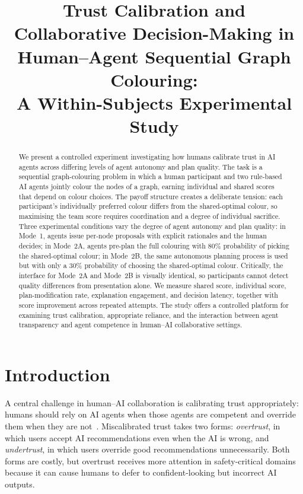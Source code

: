 \documentclass[11pt]{article}
\title{Trust Calibration and Collaborative Decision-Making in\\
       Human--Agent Sequential Graph Colouring:\\
       A Within-Subjects Experimental Study}
\author{}
\date{}
\theoremstyle{definition}
\begin{document}
\maketitle

\begin{abstract}

We present a controlled experiment investigating how humans calibrate trust in AI agents
across differing levels of agent autonomy and plan quality.  The task is a sequential
graph-colouring problem in which a human participant and two rule-based AI agents jointly
colour the nodes of a graph, earning individual and shared scores that depend on colour
choices.  The payoff structure creates a deliberate tension: each participant's individually
preferred colour differs from the shared-optimal colour, so maximising the team score
requires coordination and a degree of individual sacrifice.  Three experimental conditions
vary the degree of agent autonomy and plan quality: in Mode~1, agents issue per-node
proposals with explicit rationales and the human decides; in Mode~2A, agents pre-plan the
full colouring with 80\% probability of picking the shared-optimal colour; in Mode~2B, the
same autonomous planning process is used but with only a 30\% probability of choosing the
shared-optimal colour.  Critically, the interface for Mode~2A and Mode~2B is visually
identical, so participants cannot detect quality differences from presentation alone.  We
measure shared score, individual score, plan-modification rate, explanation engagement, and
decision latency, together with score improvement across repeated attempts.  The study
offers a controlled platform for examining trust calibration, appropriate reliance, and the
interaction between agent transparency and agent competence in human--AI collaborative
settings.

\end{abstract}

\section{Introduction}
\label{sec:intro}

A central challenge in human--AI collaboration is calibrating trust appropriately: humans
should rely on AI agents when those agents are competent and override them when they are
not~\citep{lee2004trust,parasuraman2010complacency}.  Miscalibrated trust takes two forms:
\emph{overtrust}, in which users accept AI recommendations even when the AI is wrong, and
\emph{undertrust}, in which users override good recommendations unnecessarily.  Both forms
are costly, but overtrust receives more attention in safety-critical domains because it can
cause humans to defer to confident-looking but incorrect AI outputs.
\end{document}
